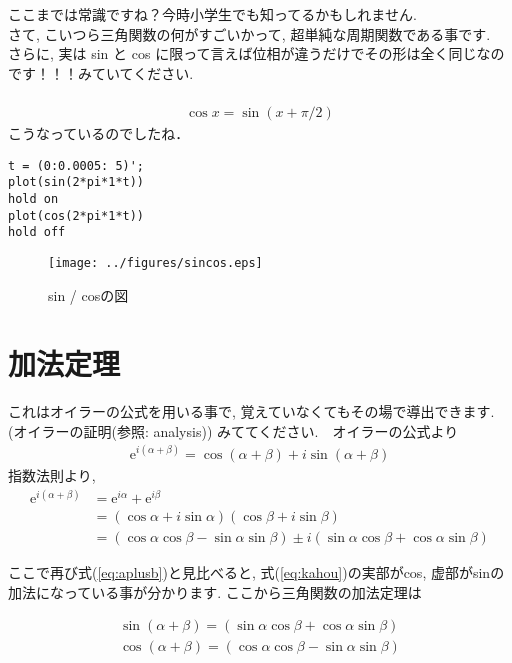 \documentclass[11pt,a4paper]{ujreport}
\begin{document}
ここまでは常識ですね？今時小学生でも知ってるかもしれません.\\

さて, こいつら三角関数の何がすごいかって, 超単純な周期関数である事です. \\

さらに, 実は sin と cos に限って言えば位相が違うだけでその形は全く同じなのです！！！みていてください.\\
\\
\begin{eqnarray}
\cos x = \sin (x + \pi/2)
\end{eqnarray}
こうなっているのでしたね．
\\

\begin{lstlisting}[caption=三角関数のMATLABコード,label=sc:tri]
t = (0:0.0005: 5)';
plot(sin(2*pi*1*t))
hold on
plot(cos(2*pi*1*t))
hold off
\end{lstlisting}


\begin{figure}[H]
\label{im:sincos}
  \centering
  \texttt{[image: ../figures/sincos.eps]}
  \caption{sin / cosの図}
\end{figure}

\section{加法定理\label{addition_theorem}}
これはオイラーの公式を用いる事で, 覚えていなくてもその場で導出できます. (オイラーの証明(参照: analysis)) みててください.　オイラーの公式より
\begin{eqnarray}
\mathrm{e}^{i(\alpha + \beta)} = \cos (\alpha + \beta) + i\sin (\alpha + \beta)
\label{eq:aplusb}
\end{eqnarray}
指数法則より,
\begin{align}
\mathrm{e}^{i(\alpha + \beta)} &= \mathrm{e}^{i\alpha} + \mathrm{e}^{i\beta} \\ &= (\cos \alpha + i\sin\alpha)(\cos\beta + i\sin\beta) \\
&= (\cos\alpha\cos\beta - \sin\alpha\sin\beta)\pm i(\sin\alpha\cos\beta + \cos\alpha\sin\beta)
\label{eq:kahou}
\end{align}

ここで再び式(\ref{eq:aplusb})と見比べると, 式(\ref{eq:kahou})の実部がcos, 虚部がsinの加法になっている事が分かります. ここから三角関数の加法定理は


\begin{eqnarray}
\sin (\alpha + \beta) = (\sin\alpha\cos\beta + \cos\alpha\sin\beta)\\
\cos (\alpha + \beta) = (\cos\alpha\cos\beta - \sin\alpha\sin\beta)
\label{kahouteiri}
\end{eqnarray}
\end{document}
